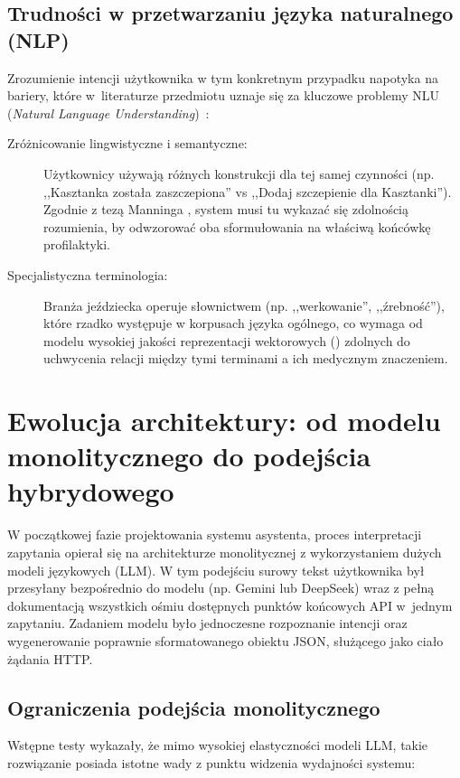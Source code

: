 \subsection*{Trudności w przetwarzaniu języka naturalnego (NLP)}

Zrozumienie intencji użytkownika w tym konkretnym przypadku napotyka na bariery, które w~literaturze przedmiotu uznaje się za kluczowe problemy NLU (\textit{Natural Language Understanding})~\cite{jurafsky2023}:

\begin{description}
    \item[Zróżnicowanie lingwistyczne i semantyczne:] Użytkownicy używają różnych konstrukcji dla tej samej czynności (np. ,,Kasztanka została zaszczepiona'' vs ,,Dodaj szczepienie dla Kasztanki''). Zgodnie z tezą Manninga \cite{manning2008}, system musi tu wykazać się zdolnością rozumienia, by odwzorować oba sformułowania na właściwą końcówkę profilaktyki.
    
    \item[Specjalistyczna terminologia:] Branża jeździecka operuje słownictwem (np. ,,werkowanie'', ,,źrebność''), które rzadko występuje w korpusach języka ogólnego, co wymaga od modelu wysokiej jakości reprezentacji wektorowych () zdolnych do uchwycenia relacji między tymi terminami a ich medycznym znaczeniem.
\end{description}

\section{Ewolucja architektury: od modelu monolitycznego do podejścia hybrydowego}

W początkowej fazie projektowania systemu asystenta, proces interpretacji zapytania opierał się na architekturze monolitycznej z wykorzystaniem dużych modeli językowych (LLM). W tym podejściu surowy tekst użytkownika był przesyłany bezpośrednio do modelu (np. Gemini lub DeepSeek) wraz z pełną dokumentacją wszystkich ośmiu dostępnych punktów końcowych API w~jednym zapytaniu. Zadaniem modelu było jednoczesne rozpoznanie intencji oraz wygenerowanie poprawnie sformatowanego obiektu JSON, służącego jako ciało żądania HTTP.

\subsection{Ograniczenia podejścia monolitycznego}

Wstępne testy wykazały, że mimo wysokiej elastyczności modeli LLM, takie rozwiązanie posiada istotne wady z punktu widzenia wydajności systemu:

